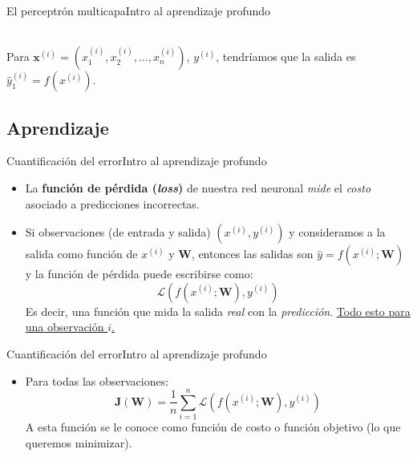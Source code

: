 \documentclass[10pt,border=3pt,tikz]{beamer}
\begin{document}
\begin{frame}{El perceptrón multicapa}{Intro al aprendizaje profundo}
\begin{center}
            \vspace{10pt}\\
            Para $\mathbf{x}^{(i)}=(x^{(i)}_1, x^{(i)}_2, \dots, x^{(i)}_n)$, $y^{(i)}$, tendríamos que la salida es $\hat{y}^{(i)}_1 = f(x^{(i)})$. 
        \end{center}
    \end{frame}
    
    \subsection{Aprendizaje}
    \begin{frame}{Cuantificación del error}{Intro al aprendizaje profundo}
        \begin{itemize}
            \item La \textbf{función de pérdida (\textit{loss})} de nuestra red neuronal \textit{mide} el \textit{costo} asociado a predicciones incorrectas.
            \item Si observaciones (de entrada y salida) $(x^{(i)}, y^{(i)})$ y consideramos a la salida como función de $x^{(i)}$ y $\mathbf{W}$, entonces las salidas son $\hat{y} = f(x^{(i)}; \mathbf{W})$ y la función de pérdida puede escribirse como:
            $$\mathcal{L}(f(x^{(i)}; \mathbf{W}), y^{(i)})$$
            Es decir, una función que mida la salida \textit{real} con la \textit{predicción}.
            \underline{Todo esto para una observación $i$.}
        \end{itemize}
    \end{frame}
    
    \begin{frame}{Cuantificación del error}{Intro al aprendizaje profundo}
        \begin{itemize}
            \item Para todas las observaciones:
            $$\mathbf{J(W)} = \displaystyle \dfrac{1}{n}\sum_{i=1}^n \mathcal{L}(f(x^{(i)}; \mathbf{W}), y^{(i)})$$
            A esta función se le conoce como función de costo o función objetivo (lo que queremos minimizar).
        \end{itemize}
    \end{frame}
    
\end{document}
